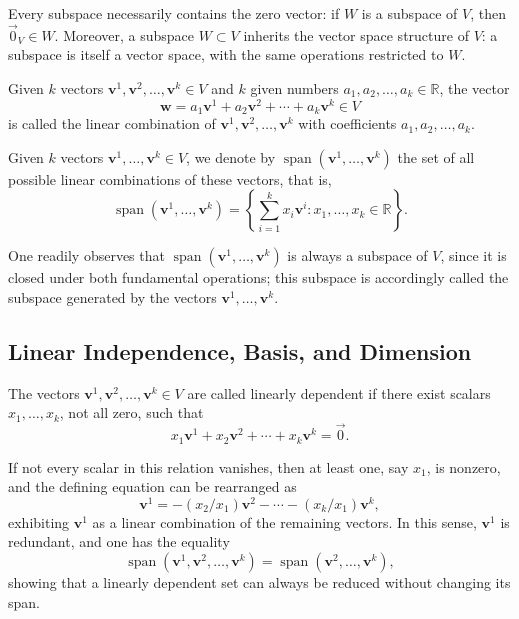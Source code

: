 \begin{remark}
Every subspace necessarily contains the zero vector: if $W$ is a subspace of $V$, then $\vec{0}_V \in W$. Moreover, a subspace $W \subset V$ inherits the vector space structure of $V$: a subspace is itself a vector space, with the same operations restricted to $W$.
\end{remark}

\begin{definition}
Given $k$ vectors $\mathbf{v}^1, \mathbf{v}^2, \dots, \mathbf{v}^k \in V$ and $k$ given numbers $a_1, a_2, \dots, a_k \in \mathbb{R}$, the vector
\[
\mathbf{w} = a_1 \mathbf{v}^1 + a_2 \mathbf{v}^2 + \cdots + a_k \mathbf{v}^k \in V
\]
 is called the linear combination of $\mathbf{v}^1, \mathbf{v}^2, \dots, \mathbf{v}^k$ with coefficients $a_1, a_2, \dots, a_k$.
\end{definition}

\begin{definition}[Span]
Given $k$ vectors $\mathbf{v}^1, \dots, \mathbf{v}^k \in V$, we denote by $\operatorname{span}(\mathbf{v}^1, \dots, \mathbf{v}^k)$ the set of all possible linear combinations of these vectors, that is,
\[
\operatorname{span}(\mathbf{v}^1, \dots, \mathbf{v}^k) = \left\{ \sum_{i=1}^{k} x_i \mathbf{v}^i : x_1, \dots, x_k \in \mathbb{R} \right\}.
\]

\end{definition}

One readily observes that $\operatorname{span}(\mathbf{v}^1, \dots, \mathbf{v}^k)$ is always a subspace of $V$, since it is closed under both fundamental operations; this subspace is accordingly called the subspace generated by the vectors $\mathbf{v}^1, \dots, \mathbf{v}^k$.

\subsection{Linear Independence, Basis, and Dimension}

\begin{definition}
The vectors $\mathbf{v}^1, \mathbf{v}^2, \dots, \mathbf{v}^k \in V$ are called linearly dependent if there exist scalars $x_1, \dots, x_k$, not all zero, such that
\[
x_1 \mathbf{v}^1 + x_2 \mathbf{v}^2 + \cdots + x_k \mathbf{v}^k = \vec{0}.
\]

\end{definition}

If not every scalar in this relation vanishes, then at least one, say $x_1$, is nonzero, and the defining equation can be rearranged as
\[
\mathbf{v}^1 = -(x_2/x_1) \mathbf{v}^2 - \cdots - (x_k/x_1) \mathbf{v}^k,
\] exhibiting $\mathbf{v}^1$ as a linear combination of the remaining vectors. In this sense, $\mathbf{v}^1$ is redundant, and one has the equality
\[
\operatorname{span}(\mathbf{v}^1, \mathbf{v}^2, \dots, \mathbf{v}^k) = \operatorname{span}(\mathbf{v}^2, \dots, \mathbf{v}^k),
\]
showing that a linearly dependent set can always be reduced without changing its span.

